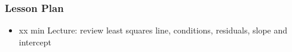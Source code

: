 \begin{frame}
    \frametitle{Lesson Plan}
    \begin{itemize}
        \item xx min Lecture: review least squares line, conditions, residuals, slope and intercept
     \end{itemize}
\end{frame}

    
